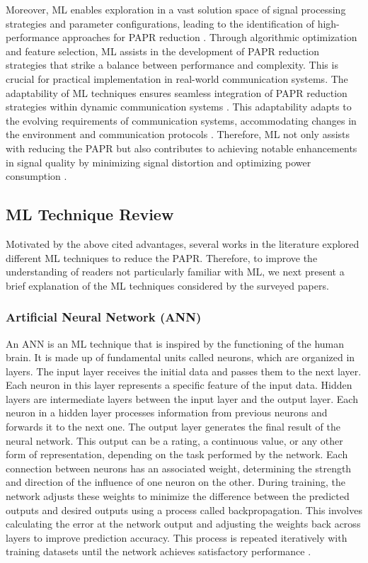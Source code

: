 \documentclass[conference]{IEEEtran}
\begin{document}
Moreover, ML enables exploration in a vast solution space of signal processing strategies and parameter configurations, leading to the identification of high-performance approaches for PAPR reduction \cite{b137}. Through algorithmic optimization and feature selection, ML assists in the development of PAPR reduction strategies that strike a balance between performance and complexity. This is crucial for practical implementation in real-world communication systems. The adaptability of ML techniques ensures seamless integration of PAPR reduction strategies within dynamic communication systems \cite{b138}. This adaptability adapts to the evolving requirements of communication systems, accommodating changes in the environment and communication protocols \cite{b139}. Therefore, ML not only assists with reducing the PAPR but also contributes to achieving notable enhancements in signal quality by minimizing signal distortion and optimizing power consumption \cite{b140}.

\subsection{ML Technique Review}
Motivated by the above cited advantages, several works in the literature explored different ML techniques \cite{b134, b135, b141, b142, b143, b144, b145, b146, b147, b148, b149, b150, b151, b152, b153, b154, b155} to reduce the PAPR. Therefore, to improve the understanding of readers not particularly familiar with ML, we next present a brief explanation of the ML techniques considered by the surveyed papers.

\subsubsection{Artificial Neural Network (ANN)}
An ANN is an ML technique that is inspired by the functioning of the human brain. It is made up of fundamental units called neurons, which are organized in layers. The input layer receives the initial data and passes them to the next layer. Each neuron in this layer represents a specific feature of the input data. Hidden layers are intermediate layers between the input layer and the output layer. Each neuron in a hidden layer processes information from previous neurons and forwards it to the next one. The output layer generates the final result of the neural network. This output can be a rating, a continuous value, or any other form of representation, depending on the task performed by the network. Each connection between neurons has an associated weight, determining the strength and direction of the influence of one neuron on the other. During training, the network adjusts these weights to minimize the difference between the predicted outputs and desired outputs using a process called backpropagation. This involves calculating the error at the network output and adjusting the weights back across layers to improve prediction accuracy. This process is repeated iteratively with training datasets until the network achieves satisfactory performance \cite{b156, b157}.
\end{document}
